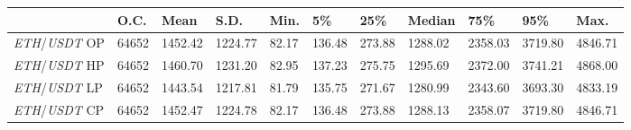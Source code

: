 \begin{tabular}{lllllllllll}
\toprule
 & \textbf{O.C.} & \textbf{Mean} & \textbf{S.D.} & \textbf{Min.} & \textbf{5\%} & \textbf{25\%} & \textbf{Median} & \textbf{75\%} & \textbf{95\%} & \textbf{Max.} \\
\midrule
\emph{ETH}/\emph{USDT} OP & 64652 & 1452.42 & 1224.77 & 82.17 & 136.48 & 273.88 & 1288.02 & 2358.03 & 3719.80 & 4846.71 \\
\emph{ETH}/\emph{USDT} HP & 64652 & 1460.70 & 1231.20 & 82.95 & 137.23 & 275.75 & 1295.69 & 2372.00 & 3741.21 & 4868.00 \\
\emph{ETH}/\emph{USDT} LP & 64652 & 1443.54 & 1217.81 & 81.79 & 135.75 & 271.67 & 1280.99 & 2343.60 & 3693.30 & 4833.19 \\
\emph{ETH}/\emph{USDT} CP & 64652 & 1452.47 & 1224.78 & 82.17 & 136.48 & 273.88 & 1288.13 & 2358.07 & 3719.80 & 4846.71 \\
\bottomrule
\end{tabular}
